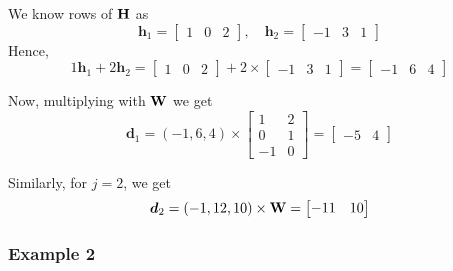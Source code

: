 \documentclass[aps, prd, showpacs, floatfix, superscriptaddress, twocolumn, nofootinbib, preprintnumbers, longbibliography]{revtex4-2}
\begin{document}
We know rows of ${\bf H}$ as 
\[
\bm{h}_1 =
\begin{bmatrix}
1 & 0 & 2
\end{bmatrix}, \quad
\bm{h}_2 =
\begin{bmatrix}
-1 & 3 & 1
\end{bmatrix}
\]
Hence,
\[
1 \bm{h}_1 + 2 \bm{h}_2 = 
\begin{bmatrix}
1 & 0 & 2
\end{bmatrix}
+ 2 \times
\begin{bmatrix}
-1 & 3 & 1
\end{bmatrix}
=
\begin{bmatrix}
-1 & 6 & 4
\end{bmatrix}
\]

Now, multiplying with \( {\bf W} \) we get
\[
\bm{d}_1 = (-1,6,4) \times
\begin{bmatrix}
1 & 2 \\
0 & 1 \\
-1 & 0
\end{bmatrix}
=
\begin{bmatrix}
-5 & 4
\end{bmatrix}
\]

Similarly, for \( j = 2 \), we get
\[
\bm{d}_2 = (-1,12,10) \times {\bf W} = \begin{bmatrix} -11 & 10 \end{bmatrix}
\]


\subsubsection{Example 2}\label{eg_2}
\end{document}

